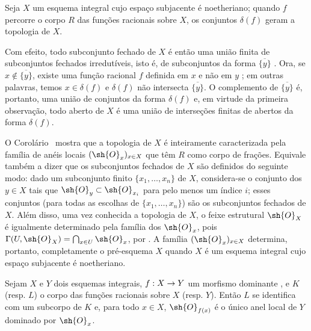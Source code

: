\documentclass[oneside]{amsart}
\makeatletter
\newcommand{\ega@arrow}[2]{\mathchoice{#1}{#2}{#2}{#2}}
\renewcommand{\to}{\ega@arrow{\longrightarrow}{\rightarrow}}
\let\EGAOriginalLabel\label
\renewcommand{\label}[1]{\phantomsection\EGAOriginalLabel{#1}}
\makeatother
\begin{document}
\begin{corollary}[8.2.5]
\label{I.8.2.5}
Seja $X$ um esquema integral cujo espaço subjacente é noetheriano;
quando $f$ percorre o corpo $R$ das funções racionais sobre $X$, os conjuntos $\delta(f)$ geram a topologia de $X$.
\end{corollary}

Com efeito, todo subconjunto fechado de $X$ é então uma união finita de subconjuntos fechados irredutíveis, isto é, de subconjuntos da forma $\overline{\{y\}}$ .
Ora, se $x\not\in\overline{\{y\}}$, existe uma função racional $f$ definida em $x$ e não em $y$ ; em outras palavras, temos $x\in\delta(f)$ e $\delta(f)$ não intersecta $\overline{\{y\}}$.
O complemento de $\overline{\{y\}}$ é, portanto, uma união de conjuntos da forma $\delta(f)$ e, em virtude da primeira observação, todo aberto de $X$ é uma união de interseções finitas de abertos da forma $\delta(f)$.

\begin{env}[8.2.6]
\label{I.8.2.6}
O Corolário~ mostra que a topologia de $X$ é inteiramente caracterizada pela família de anéis locais $(\sh{O}_x)_{x\in X}$ que têm $R$ como corpo de frações.
Equivale também a dizer que os subconjuntos fechados de $X$ são definidos do seguinte modo: dado um subconjunto finito $\{x_1,\ldots,x_n\}$ de $X$, considera-se o conjunto dos $y\in X$ tais que $\sh{O}_y\subset\sh{O}_{x_i}$ para pelo menos um índice $i$; esses conjuntos (para todas as escolhas de $\{x_1,\ldots,x_n\}$) são os subconjuntos fechados de $X$.
Além disso, uma vez conhecida a topologia de $X$, o feixe estrutural $\sh{O}_X$ é igualmente determinado pela família dos $\sh{O}_x$, pois $\Gamma(U,\sh{O}_X)=\bigcap_{x\in U}\sh{O}_x$, por .
A família $(\sh{O}_x)_{x\in X}$ determina, portanto, completamente o pré-esquema $X$ quando $X$ é um esquema integral cujo espaço subjacente é noetheriano.
\end{env}

\begin{proposition}[8.2.7]
\label{I.8.2.7}
Sejam $X$ e $Y$ dois esquemas integrais, $f:X\to Y$ um morfismo dominante , e $K$ (resp. $L$) o corpo das funções racionais sobre $X$ (resp. $Y$).
Então $L$ se identifica com um subcorpo de $K$ e, para todo $x\in X$, $\sh{O}_{f(x)}$ é o único anel local de $Y$ dominado por $\sh{O}_x$.
\end{proposition}
\end{document}
